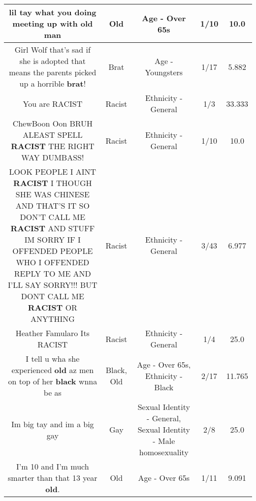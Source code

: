 \documentclass[11pt]{article}
\newlength\mylength
\begin{document}
\begin{center}
\begin{longtable}{|C{.65\mylength}|C{.30\mylength}|C{.12\mylength}|C{.12\mylength}|C{.12\mylength}|}
  \small lil tay what you doing meeting up with \textbf{old} man\normalsize   & Old & Age - Over 65s & 1/10 & 10.0 \\  \hline
  \small Girl Wolf that's sad if she is adopted that means the parents picked up a horrible \textbf{brat}!\normalsize   & Brat & Age - Youngsters & 1/17 & 5.882 \\  \hline
  \small You are RACIST\normalsize   & Racist & Ethnicity - General & 1/3 & 33.333 \\  \hline
  \small ChewBoon Oon BRUH ALEAST SPELL \textbf{RACIST} THE RIGHT WAY DUMBASS!\normalsize   & Racist & Ethnicity - General & 1/10 & 10.0 \\  \hline
  \small LOOK PEOPLE I AINT \textbf{RACIST} I THOUGH SHE WAS CHINESE AND THAT'S IT SO DON'T CALL ME \textbf{RACIST} AND STUFF IM SORRY IF I OFFENDED PEOPLE WHO I OFFENDED REPLY TO ME AND I'LL SAY SORRY!!! BUT DONT CALL ME \textbf{RACIST} OR ANYTHING\normalsize   & Racist & Ethnicity - General & 3/43 & 6.977 \\  \hline
  \small Heather Famularo Its RACIST\normalsize   & Racist & Ethnicity - General & 1/4 & 25.0 \\  \hline
  \small I tell u wha she experienced \textbf{old} az men on top of her \textbf{black} wnna be as\normalsize   & Black, Old & Age - Over 65s, Ethnicity - Black & 2/17 & 11.765 \\  \hline
  \small Im big tay and im a big gay\normalsize   & Gay & Sexual Identity - General, Sexual Identity - Male homosexuality & 2/8 & 25.0 \\  \hline
  \small I'm 10 and I'm much smarter than that 13 year \textbf{old}.\normalsize   & Old & Age - Over 65s & 1/11 & 9.091 \\  \hline

\end{longtable}
\end{center}
\end{document}
